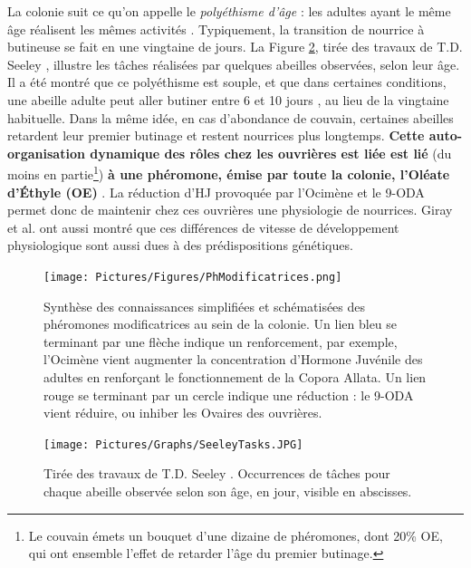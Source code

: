 			 La colonie suit ce qu'on appelle le \textit{polyéthisme d'âge} : les adultes ayant le même âge réalisent les mêmes activités \cite{seeley_age_1991}. Typiquement, la transition de nourrice à butineuse se fait en une vingtaine de jours. La Figure \ref{SeeleyTasks}, tirée des travaux de T.D. Seeley \cite{seeley_wisdom_1995}, illustre les tâches réalisées par quelques abeilles observées, selon leur âge. Il a été montré que ce polyéthisme est souple, et que dans certaines conditions, une abeille adulte peut aller butiner entre 6 et 10 jours \cite{giray_effects_1994}, au lieu de la vingtaine habituelle. Dans la même idée, en cas d'abondance de couvain, certaines abeilles retardent leur premier butinage et restent nourrices plus longtemps. \textbf{Cette auto-organisation dynamique des rôles chez les ouvrières est liée est lié} (du moins en partie\footnote{Le couvain émets un bouquet d'une dizaine de phéromones, dont 20\% OE, qui ont ensemble l'effet de retarder l'âge du premier butinage.}) \textbf{à une phéromone, émise par toute la colonie, l'Oléate d'Éthyle (OE)} \cite{le_conte_primer_2001}. La réduction d'HJ provoquée par l'Ocimène et le 9-ODA permet donc de maintenir chez ces ouvrières une physiologie de nourrices. Giray et al. \cite{giray_effects_1994} ont aussi montré que ces différences de vitesse de développement physiologique sont aussi dues à des prédispositions génétiques.		 
			
			\begin{figure}
			\centering
				\texttt{[image: Pictures/Figures/PhModificatrices.png]}
				\caption[Synthèse des connaissances simplifiées et schématisées des phéromones modificatrices au sein de la colonie.]{Synthèse des connaissances simplifiées et schématisées des phéromones modificatrices au sein de la colonie. Un lien bleu se terminant par une flèche indique un renforcement, par exemple, l'Ocimène vient augmenter la concentration d'Hormone Juvénile des adultes en renforçant le fonctionnement de la Copora Allata. Un lien rouge se terminant par un cercle indique une réduction : le 9-ODA vient réduire, ou inhiber les Ovaires des ouvrières.}
				\label{phMod}
			\end{figure}	
			
			\begin{figure}
			\centering
				\texttt{[image: Pictures/Graphs/SeeleyTasks.JPG]}
				\caption{Tirée des travaux de T.D. Seeley \cite{seeley_wisdom_1995}. Occurrences de tâches pour chaque abeille observée selon son âge, en jour, visible en abscisses.}
				\label{SeeleyTasks}
			\end{figure}	
			
